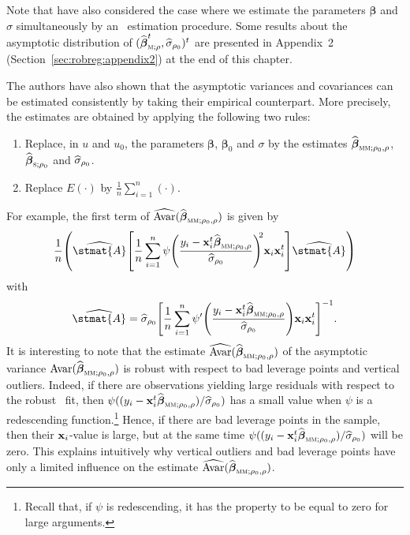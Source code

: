 \begin{stremark}
Note that \citet{Croux:2003} have also considered the case where we estimate
the parameters $\boldsymbol\beta$ and $\sigma$ simultaneously by an 
~estimation procedure. Some results about the asymptotic distribution of
$(\sthat{\boldsymbol\beta}_{\stsc{M};\rho}^t, \sthat{\sigma}_{\rho_0})^t$ are
presented in Appendix~2 (Section~\ref{sec:robreg:appendix2}) at the end of this
chapter.
\end{stremark}

The authors have also shown that the asymptotic variances and covariances can
be estimated consistently by taking their empirical counterpart. More
precisely, the estimates are obtained by applying the following two rules:
\begin{enumerate}
    \item Replace, in $u$ and $u_0$, the parameters $\boldsymbol\beta$,
    $\boldsymbol\beta_0$ and $\sigma$ by the estimates
    $\widehat{\boldsymbol\beta}_{\stsc{MM};\rho_0,\rho}$,
    $\sthat{\boldsymbol\beta}_{\stsc{S};\rho_0}$ and $\widehat{\sigma}_{\rho_0}$.

    \item Replace $E(\cdot)$ by $\frac{1}{n}\sum_{i=1}^{n}(\cdot)$.
\end{enumerate}
For example, the first term of
$\sthat{\mathrm{Avar}}(\widehat{\boldsymbol\beta}_{\stsc{MM};\rho_0,\rho})$ is
given by
\[
    \frac{1}{n} \left(\sthat{\stmat{A}}\left[
    \frac{1}{n} \sum_{i=1}^{n} \psi\left(
    \frac{y_i - \stvec{x}_i^t\sthat{\boldsymbol\beta}_{\stsc{MM};\rho_0,\rho}}
    {\sthat{\sigma}_{\rho_0}}\right)^{\!\!2} \stvec{x}_i\stvec{x}_i^t\right]
    \widehat{\stmat{A}}\right)
\]
with
\[
    \sthat{\stmat{A}} = \sthat{\sigma}_{\rho_0}
    \left[\frac{1}{n} \sum_{i=1}^{n} 
    \psi'\left(\frac{y_i-\stvec{x}_i^t\widehat{\boldsymbol\beta}_{\stsc{MM};\rho_0,\rho}}
    {\sthat{\sigma}_{\rho_0}}\right) \stvec{x}_i\stvec{x}_i^t\right]^{-1}.
\]
It is interesting to note that the estimate $\sthat{\mathrm{Avar}}
(\sthat{\boldsymbol\beta}_{\stsc{MM};\rho_0,\rho})$ of the asymptotic variance
$\mathrm{Avar}(\sthat{\boldsymbol\beta}_{\stsc{MM};\rho_0,\rho})$ is robust
with respect to bad leverage points and vertical outliers. Indeed, if there are
observations yielding large residuals with respect to the robust ~fit,
then
$\psi((y_i-\stvec{x}_i^t\sthat{\boldsymbol\beta}_{\stsc{MM};\rho_0,\rho})/\sthat{\sigma}_{\rho_0})$
has a small value when $\psi$ is a redescending function.\footnote{Recall that,
if $\psi$ is redescending, it has the property to be equal to zero for large
arguments.} Hence, if there are bad leverage points in the sample, then their
$\mathbf x_i$-value is large, but at the same time
$\psi((y_i-\stvec{x}_i^t\sthat{\boldsymbol\beta}_{\stsc{MM};\rho_0,\rho})/\sthat{\sigma}_{\rho_0})$ 
will be zero. This explains intuitively why vertical outliers and bad leverage
points have only a limited influence on the estimate
$\sthat{\mathrm{Avar}}(\widehat{\boldsymbol\beta}_{\stsc{MM};\rho_0,\rho})$.

